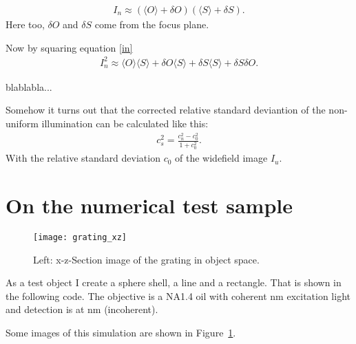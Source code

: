 \documentclass[11pt,abstracton,titlepage]{scrartcl}
\newcommand{\avg}[1]{\langle #1 \rangle}
\newcommand{\figref}[1]{Figure~\ref{#1}}
\begin{document}
\begin{align}
\label{in}
  I_n\approx (\avg{O}+\delta O)(\avg{S}+\delta S).
\end{align}
Here too, $\delta O$ and $\delta S$ come from the focus plane.

Now by squaring equation \ref{in}
\begin{align}
  I_n^2\approx \avg{O}\avg{S} + \delta O \avg{S} +\delta S\avg{S} +
  \delta S \delta O.
\end{align}

blablabla...

Somehow it turns out that the corrected relative standard deviantion
of the non-uniform illumination can be calculated like this:
\begin{align} 
  c_s^2=\frac{c_n^2-c_0^2}{1+c_0^2}.
\end{align}
With the relative standard deviation $c_0$ of the widefield image
$I_u$.


\section{On the numerical test sample}
\begin{figure}[htb]
  \centering
  \texttt{[image: grating\_xz]}

  \caption{Left: x-z-Section %
    image of the grating in object space.}
  \label{fig:grating}
\end{figure}

As a test object I create a sphere shell, a line and a rectangle.
That is shown in the following code.  The objective is a NA1.4 oil
with coherent \unit[473]{nm} excitation light and detection is at
\unit[520]{nm} (incoherent).

Some images of this simulation are shown in \figref{fig:grating}.
\end{document}
